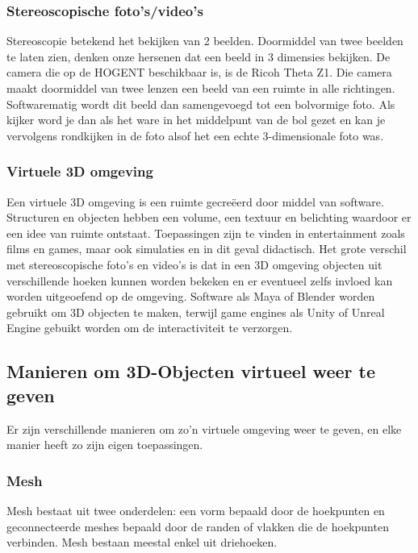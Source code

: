 \documentclass{hogent-article}
\begin{document}
\subsubsection{Stereoscopische foto’s/video’s }

Stereoscopie betekend het bekijken van 2 beelden. Doormiddel van twee beelden te laten zien, denken onze hersenen dat een beeld in 3 dimensies bekijken. De camera die op de HOGENT beschikbaar is, is de Ricoh Theta Z1. Die camera maakt doormiddel van twee lenzen een beeld van een ruimte in alle richtingen. Softwarematig wordt dit beeld dan samengevoegd tot een bolvormige foto. Als kijker word je dan als het ware in het middelpunt van de bol gezet en kan je vervolgens rondkijken in de foto alsof het een echte 3-dimensionale foto was. 

\subsubsection{Virtuele 3D omgeving}

Een virtuele 3D omgeving is een ruimte gecreëerd door middel van software. Structuren en objecten hebben een volume, een textuur en belichting waardoor er een idee van ruimte ontstaat. Toepassingen zijn te vinden in entertainment zoals films en games, maar ook simulaties en in dit geval didactisch. Het grote verschil met stereoscopische foto’s en video’s is dat in een 3D omgeving objecten uit verschillende hoeken kunnen worden bekeken en er eventueel zelfs invloed kan worden uitgeoefend op de omgeving. Software als Maya of Blender worden gebruikt om 3D objecten te maken, terwijl game engines als Unity of Unreal Engine gebuikt worden om de interactiviteit te verzorgen. 

\subsection{Manieren om 3D-Objecten virtueel weer te geven}

Er zijn verschillende manieren om zo’n virtuele omgeving weer te geven, en elke manier heeft zo zijn eigen toepassingen. 

\subsubsection{Mesh}

Mesh bestaat uit twee onderdelen: een vorm bepaald door de hoekpunten  en geconnecteerde meshes bepaald door de randen of vlakken die de hoekpunten verbinden. Mesh bestaan meestal enkel uit driehoeken. \autocite{Luebke2002} 
\end{document}
